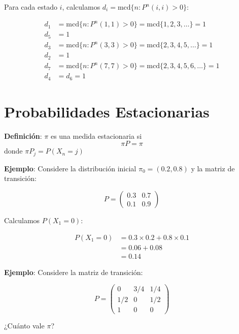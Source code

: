 \documentclass[12pt,a4paper]{article}
\newcommand{\definicion}[1]{%
\begin{definicionbox}
\textbf{Definición}: #1
\end{definicionbox}
}
\begin{document}
Para cada estado $i$, calculamos $d_i = \text{mcd} \{n: P^n(i,i) > 0\}$:

\begin{align*}
d_1 &= \text{mcd} \{n: P^n(1,1) > 0\} = \text{mcd} \{1, 2, 3, \dots\} = 1 \\
d_5 &= 1 \\
d_3 &= \text{mcd} \{n: P^n(3,3) > 0\} = \text{mcd} \{2, 3, 4, 5, \dots\} = 1 \\
d_2 &= 1 \\
d_7 &= \text{mcd} \{n: P^n(7,7) > 0\} = \text{mcd} \{2, 3, 4, 5, 6, \dots\} = 1 \\
d_4 &= d_6 = 1
\end{align*}

\section*{Probabilidades Estacionarias}

\definicion{$\pi$ es una medida estacionaria si
\begin{equation}
\pi P = \pi
\end{equation}
donde $\pi P_j = P(X_n = j)$
}

\textbf{Ejemplo}: Considere la distribución inicial $\pi_0 = (0.2, 0.8)$ y la matriz de transición:

\begin{equation*}
P = \begin{pmatrix}
0.3 & 0.7 \\
0.1 & 0.9
\end{pmatrix}
\end{equation*}

Calculamos $P(X_1 = 0)$:

\begin{align*}
P(X_1 = 0) &= 0.3 \times 0.2 + 0.8 \times 0.1 \\
&= 0.06 + 0.08 \\
&= 0.14
\end{align*}

\textbf{Ejemplo}: Considere la matriz de transición:

\begin{equation*}
P = \begin{pmatrix}
0 & 3/4 & 1/4 \\
1/2 & 0 & 1/2 \\
1 & 0 & 0
\end{pmatrix}
\end{equation*}

¿Cuánto vale $\pi$?
\end{document}
